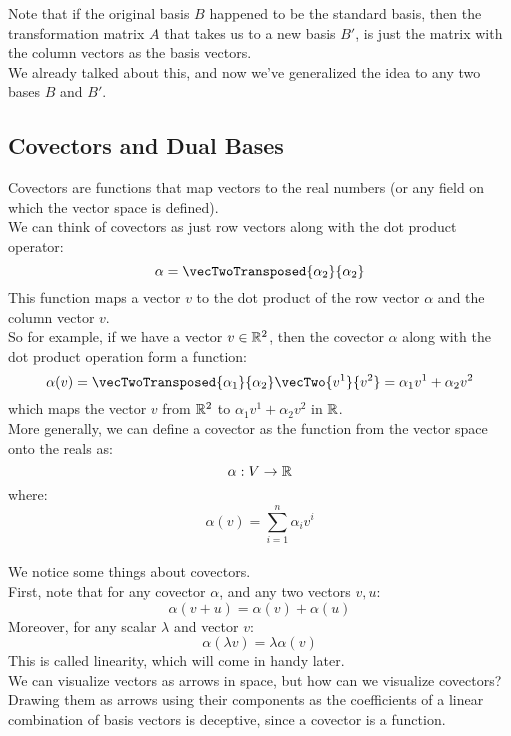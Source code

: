\documentclass[12pt]{article}
\begin{document}
Note that if the original basis $B$ happened
to be the standard basis, then the
transformation matrix $A$
that takes us to a new basis $B'$,
is just the matrix with the column vectors
as the basis vectors. \\
We already talked about this,
and now we've generalized the idea
to any two bases $B$ and $B'$. \\

\newpage

\subsection*{Covectors and Dual Bases}

Covectors are functions
that map vectors to the real numbers
(or any field on which the vector space
is defined). \\

We can think of covectors as just row vectors
along with the dot product operator:
\[ \alpha = \vecTwoTransposed{\alpha_2}{\alpha_2} \]
This function maps a vector $v$
to the dot product of the row vector $\alpha$
and the column vector $v$. \\

So for example, if we have a vector $v \in \mathbb{R}^2$,
then the covector $\alpha$ along with the dot product
operation form a function:
\[ \alpha(v) =
\vecTwoTransposed{\alpha_1}{\alpha_2}
\vecTwo{v^1}{v^2} = \alpha_1v^1 + \alpha_2v^2 \]
which maps the vector $v$ from $\mathbb{R}^2$
to $\alpha_1v^1 + \alpha_2v^2$ in $\mathbb{R}$. \\

More generally, we can define a covector
as the function from the vector space
onto the reals as:
\[ \alpha: V \to \mathbb{R} \]
where:
\[ \alpha(v) = \sum_{i = 1}^{n} \alpha_iv^i \] \\

We notice some things about covectors. \\
First, note that for any covector $\alpha$,
and any two vectors $v, u$:
\[ \alpha(v + u) = \alpha(v) + \alpha(u) \]
Moreover, for any scalar $\lambda$
and vector $v$:
\[ \alpha(\lambda v) = \lambda \alpha(v) \]
This is called linearity,
which will come in handy later. \\

We can visualize vectors as arrows in space,
but how can we visualize covectors?
Drawing them as arrows using their components
as the coefficients of a linear combination
of basis vectors is deceptive,
since a covector is a function. \\
\end{document}
